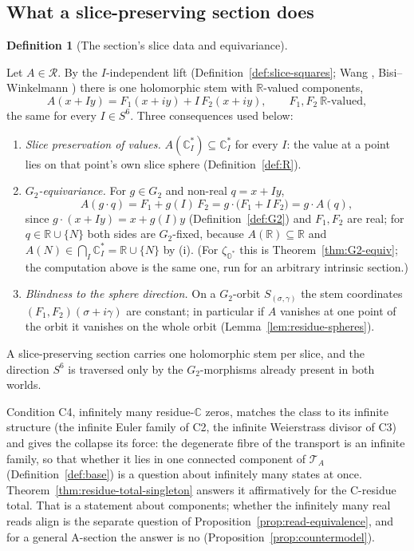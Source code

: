 \documentclass[11pt]{article}
\newcommand{\OO}{\mathbb{O}}
\newcommand{\CC}{\mathbb{C}}
\newcommand{\RR}{\mathbb{R}}
\newcommand{\Ostar}{\OO^{*}}
\newcommand{\zetaO}{\zeta_{\Ostar}}
\providecommand{\Gtwo}{G_2}
\providecommand{\lean}[1]{}
\providecommand{\uses}[1]{}
\theoremstyle{plain}
\theoremstyle{definition}
\newtheorem{definition}[theorem]{Definition}
\theoremstyle{remark}
\begin{document}
\subsection*{What a slice-preserving section does}

\begin{definition}[The section's slice data and equivariance]\label{def:section-map}
\lean{ASection.realize, ASection.realize_mem_sliceSphere,
ASection.realize_equivariant, ASection.sliceCoord_smul_invariant}
\uses{def:slice-squares, def:slice-preserving, thm:rep-formula}
Let $A\in\mathcal R$. By the $I$-independent lift (Definition~\ref{def:slice-squares}; Wang
\cite[Rem.~2.11]{Wang}, Bisi--Winkelmann \cite[\S3.7]{BisiWinkelmann}) there is one holomorphic
stem with $\RR$-valued components,
\[
  A(x+Iy)=F_1(x+iy)+I\,F_2(x+iy),\qquad F_1,F_2\ \RR\text{-valued},
\]
the same for every $I\in S^6$. Three consequences used below:
\begin{enumerate}[label=\textup{(\roman*)},leftmargin=2.6em]
\item \emph{Slice preservation of values.} $A(\CC_I^{*})\subseteq\CC_I^{*}$ for every $I$: the
  value at a point lies on that point's own slice sphere (Definition~\ref{def:R}).
\item \emph{$\Gtwo$-equivariance.} For $g\in\Gtwo$ and non-real $q=x+Iy$,
  \[
    A(g\cdot q)=F_1+g(I)\,F_2=g\cdot\bigl(F_1+I\,F_2\bigr)=g\cdot A(q),
  \]
  since $g\cdot(x+Iy)=x+g(I)y$ (Definition~\ref{def:G2}) and $F_1,F_2$ are real; for
  $q\in\RR\cup\{N\}$ both sides are $\Gtwo$-fixed, because $A(\RR)\subseteq\RR$ and
  $A(N)\in\bigcap_I\CC_I^{*}=\RR\cup\{N\}$ by \textup{(i)}. (For $\zetaO$ this is
  Theorem~\ref{thm:G2-equiv}; the computation above is the same one, run for an arbitrary
  intrinsic section.)
\item \emph{Blindness to the sphere direction.} On a $\Gtwo$-orbit $S_{(\sigma,\gamma)}$ the stem
  coordinates $(F_1,F_2)(\sigma+i\gamma)$ are constant; in particular if $A$ vanishes at one
  point of the orbit it vanishes on the whole orbit (Lemma~\ref{lem:residue-spheres}).
\end{enumerate}
A slice-preserving section carries one holomorphic stem per slice, and the direction $S^6$ is
traversed only by the $\Gtwo$-morphisms already present in both worlds.
\end{definition}

Condition \textup{C4}, infinitely many residue-$\CC$ zeros, matches the class to its
infinite structure (the infinite Euler family of \textup{C2}, the infinite Weierstrass divisor of
\textup{C3}) and gives the collapse its force: the degenerate fibre of the transport is an
infinite family, so that whether it lies in one connected component of $\mathcal T_A$
(Definition~\ref{def:base}) is a question about infinitely many states at once.
Theorem~\ref{thm:residue-total-singleton} answers it affirmatively for the C-residue total. That is
a statement about components; whether the infinitely many real reads align is the separate
question of Proposition~\ref{prop:read-equivalence}, and for a general A-section the answer is no
(Proposition~\ref{prop:countermodel}).
\end{document}
